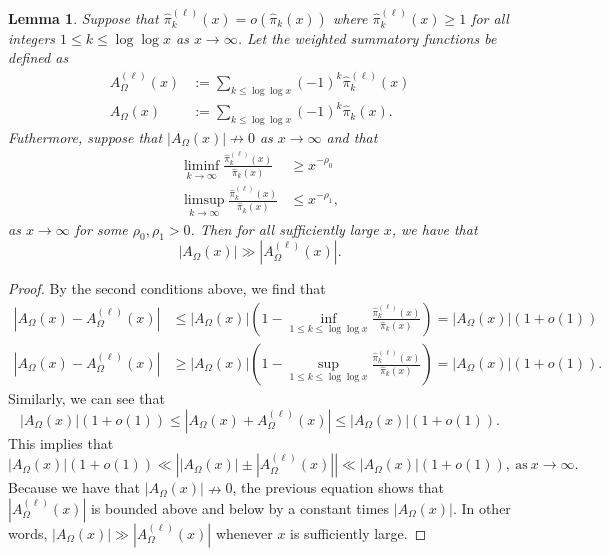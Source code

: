 \documentclass[11pt,reqno,a4letter]{article}
\numberwithin{figure}{section}
\numberwithin{table}{section}
\theoremstyle{plain}
\newtheorem{lemma}[theorem]{Lemma}
\numberwithin{theorem}{section}
\theoremstyle{definition}
\begin{document}
\begin{lemma} 
\label{lemma_lowerBoundsOnLambdaFuncParitySummFuncs} 
Suppose that $\widehat{\pi}_k^{(\ell)}(x) = o\left(\widehat{\pi}_k(x)\right)$ where 
$\widehat{\pi}_k^{(\ell)}(x) \geq 1$ 
for all integers $1 \leq k \leq \log\log x$ as $x \rightarrow \infty$. 
Let the weighted summatory functions be defined as 
\begin{align*} 
A_{\Omega}^{(\ell)}(x) & := \sum_{k \leq \log\log x} (-1)^k \widehat{\pi}_k^{(\ell)}(x) \\ 
A_{\Omega}(x) & := \sum_{k \leq \log\log x} (-1)^k \widehat{\pi}_k(x). 
\end{align*} 
Futhermore, suppose that $|A_{\Omega}(x)| \nrightarrow 0$ as $x \rightarrow \infty$ and that 
\begin{align*} 
\liminf_{k \rightarrow \infty} \frac{\widehat{\pi}_k^{(\ell)}(x)}{\widehat{\pi}_k(x)} & \geq 
     x^{-\rho_0} \\ 
\limsup_{k \rightarrow \infty} \frac{\widehat{\pi}_k^{(\ell)}(x)}{\widehat{\pi}_k(x)} & \leq 
     x^{-\rho_1}, 
\end{align*} 
as $x \rightarrow \infty$ for some $\rho_0, \rho_1 > 0$. 
Then for all sufficiently large $x$, we have that 
$$|A_{\Omega}(x)| \gg |A_{\Omega}^{(\ell)}(x)|.$$ 
\end{lemma} 
\begin{proof} 
By the second conditions above, we find that 
\begin{align*} 
\left\lvert A_{\Omega}(x) - A_{\Omega}^{(\ell)}(x) \right\rvert & \leq 
     |A_{\Omega}(x)| \left(1 - \inf_{1 \leq k \leq \log\log x} 
     \frac{\widehat{\pi}_k^{(\ell)}(x)}{\widehat{\pi}_k(x)}\right) = 
     |A_{\Omega}(x)| (1 + o(1)) \\ 
\left\lvert A_{\Omega}(x) - A_{\Omega}^{(\ell)}(x) \right\rvert & \geq 
     |A_{\Omega}(x)| \left(1 - \sup_{1 \leq k \leq \log\log x} 
     \frac{\widehat{\pi}_k^{(\ell)}(x)}{\widehat{\pi}_k(x)}\right) = 
     |A_{\Omega}(x)| (1 + o(1)). 
\end{align*} 
Similarly, we can see that 
\[
|A_{\Omega}(x)| (1 + o(1)) \leq \left\lvert A_{\Omega}(x) + A_{\Omega}^{(\ell)}(x) \right\rvert 
     \leq |A_{\Omega}(x)| (1 + o(1)). 
\]
This implies that 
\[
|A_{\Omega}(x)|(1+o(1)) \ll \left\lvert |A_{\Omega}(x)| \pm |A_{\Omega}^{(\ell)}(x)| \right\rvert \ll 
     |A_{\Omega}(x)|(1+o(1)), \mathrm{\ as\ } x \rightarrow \infty. 
\]
Because we have that 
$|A_{\Omega}(x)| \nrightarrow 0$, the previous equation shows that 
$|A_{\Omega}^{(\ell)}(x)|$ is bounded above and below by a constant times 
$|A_{\Omega}(x)|$. In other words, $|A_{\Omega}(x)| \gg |A_{\Omega}^{(\ell)}(x)|$ whenever 
$x$ is sufficiently large. 
\end{proof} 
\end{document}
